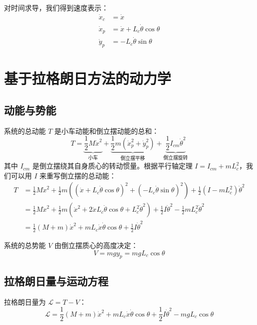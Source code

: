 \documentclass[a4paper,12pt]{article}
\begin{document}
对时间求导，我们得到速度表示：
\begin{align}
    \dot{x}_c &= \dot{x} \\
    \dot{x}_p &= \dot{x} + L_c \dot{\theta} \cos\theta \\
    \dot{y}_p &= -L_c \dot{\theta} \sin\theta
\end{align}

\section{基于拉格朗日方法的动力学}
\subsection{动能与势能}
系统的总动能 $T$ 是小车动能和倒立摆动能的总和：
\begin{equation}
    T = \underbrace{\frac{1}{2} M \dot{x}^2}_{\text{小车}} + \underbrace{\frac{1}{2} m (\dot{x}_p^2 + \dot{y}_p^2)}_{\text{倒立摆平移}} + \underbrace{\frac{1}{2} I_{cm} \dot{\theta}^2}_{\text{倒立摆旋转}}
\end{equation}
其中 $I_{cm}$ 是倒立摆绕其自身质心的转动惯量。根据平行轴定理 $I = I_{cm} + m L_c^2$，我们可以用 $I$ 来重写倒立摆的总动能：
\begin{align}
    T &= \frac{1}{2} M \dot{x}^2 + \frac{1}{2} m \left( (\dot{x} + L_c \dot{\theta} \cos\theta)^2 + (-L_c \dot{\theta} \sin\theta)^2 \right) + \frac{1}{2} (I - m L_c^2) \dot{\theta}^2 \\
      &= \frac{1}{2} M \dot{x}^2 + \frac{1}{2} m (\dot{x}^2 + 2 \dot{x} L_c \dot{\theta} \cos\theta + L_c^2 \dot{\theta}^2) + \frac{1}{2} I \dot{\theta}^2 - \frac{1}{2} m L_c^2 \dot{\theta}^2 \\
      &= \frac{1}{2} (M + m) \dot{x}^2 + m L_c \dot{x} \dot{\theta} \cos\theta + \frac{1}{2} I \dot{\theta}^2
\end{align}

系统的总势能 $V$ 由倒立摆质心的高度决定：
\begin{equation}
    V = m g y_p = m g L_c \cos\theta
\end{equation}

\subsection{拉格朗日量与运动方程}
拉格朗日量为 $\mathcal{L} = T - V$：
\begin{equation}
    \mathcal{L} = \frac{1}{2} (M + m) \dot{x}^2 + m L_c \dot{x} \dot{\theta} \cos\theta + \frac{1}{2} I \dot{\theta}^2 - m g L_c \cos\theta
\end{equation}
\end{document}

